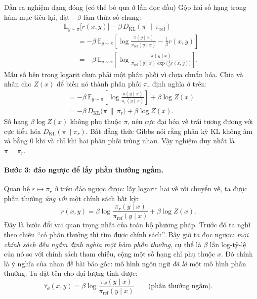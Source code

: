 \begin{deepdive}{Dẫn ra nghiệm dạng đóng (có thể bỏ qua ở lần đọc đầu)}
Gộp hai số hạng trong hàm mục tiêu lại, đặt \( -\beta \) làm thừa số chung:
\[
\begin{aligned}
    &\mathbb{E}_{y \sim \pi}\big[ r(x,y) \big] - \beta\, D_{\text{KL}}(\pi \,\|\, \pi_{\text{ref}}) \\[4pt]
    &\qquad = -\beta\, \mathbb{E}_{y \sim \pi}\left[ \log \frac{\pi(y \mid x)}{\pi_{\text{ref}}(y \mid x)} - \frac{1}{\beta} r(x,y) \right] \\[4pt]
    &\qquad = -\beta\, \mathbb{E}_{y \sim \pi}\left[ \log \frac{\pi(y \mid x)}{\pi_{\text{ref}}(y \mid x)\exp\big(\frac{1}{\beta} r(x,y)\big)} \right].
\end{aligned}
\]
Mẫu số bên trong logarit chưa phải một phân phối vì chưa chuẩn hóa. Chia và nhân cho \( Z(x) \) để biến nó thành phân phối \( \pi_r \) định nghĩa ở trên:
\[
\begin{aligned}
    &= -\beta\, \mathbb{E}_{y \sim \pi}\left[ \log \frac{\pi(y \mid x)}{\pi_r(y \mid x)} \right] + \beta \log Z(x) \\[4pt]
    &= -\beta\, D_{\text{KL}}\big(\pi \,\|\, \pi_r\big) + \beta \log Z(x).
\end{aligned}
\]
Số hạng \( \beta \log Z(x) \) không phụ thuộc \( \pi \), nên cực đại hóa vế trái tương đương với cực tiểu hóa \( D_{\text{KL}}(\pi \| \pi_r) \). Bất đẳng thức Gibbs nói rằng phân kỳ KL không âm và bằng 0 khi và chỉ khi hai phân phối trùng nhau. Vậy nghiệm duy nhất là \( \pi = \pi_r \).
\end{deepdive}

\paragraph{Bước 3: đảo ngược để lấy phần thưởng ngầm.}
Quan hệ \( r \mapsto \pi_r \) ở trên đảo ngược được: lấy logarit hai vế rồi chuyển vế, ta được phần thưởng \emph{ứng với} một chính sách bất kỳ:
\[
    r(x,y) = \beta \log \frac{\pi_r(y \mid x)}{\pi_{\text{ref}}(y \mid x)} + \beta \log Z(x).
\]
Đây là bước đổi vai quan trọng nhất của toàn bộ phương pháp. Trước đó ta nghĩ theo chiều ``có phần thưởng thì tìm được chính sách''. Bây giờ ta đọc ngược: \emph{mọi chính sách đều ngầm định nghĩa một hàm phần thưởng}, cụ thể là \( \beta \) lần log-tỷ-lệ của nó so với chính sách tham chiếu, cộng một số hạng chỉ phụ thuộc \( x \). Đó chính là ý nghĩa của nhan đề bài báo gốc: mô hình ngôn ngữ \emph{đã là} một mô hình phần thưởng. Ta đặt tên cho đại lượng tính được:
\[
    \hat{r}_{\theta}(x,y) = \beta \log \frac{\pi_{\theta}(y \mid x)}{\pi_{\text{ref}}(y \mid x)}
    \qquad \text{(phần thưởng ngầm).}
\]

